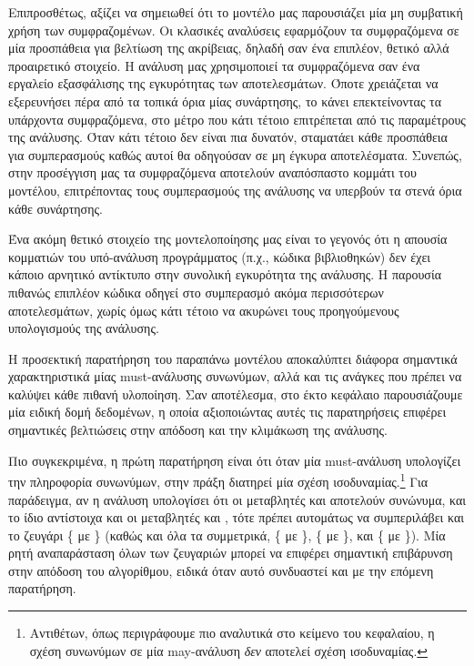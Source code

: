 Επιπροσθέτως, αξίζει να σημειωθεί ότι το μοντέλο μας παρουσιάζει μία μη συμβατική χρήση των συμφραζομένων. Οι κλασικές αναλύσεις εφαρμόζουν τα συμφραζόμενα σε μία προσπάθεια για βελτίωση της ακρίβειας, δηλαδή σαν ένα επιπλέον, θετικό αλλά προαιρετικό στοιχείο. Η ανάλυση μας χρησιμοποιεί τα συμφραζόμενα σαν ένα εργαλείο εξασφάλισης της εγκυρότητας των αποτελεσμάτων. Όποτε χρειάζεται να εξερευνήσει πέρα από τα τοπικά όρια μίας συνάρτησης, το κάνει επεκτείνοντας τα υπάρχοντα συμφραζόμενα, στο μέτρο που κάτι τέτοιο επιτρέπεται από τις παραμέτρους της ανάλυσης. Όταν κάτι τέτοιο δεν είναι πια δυνατόν, σταματάει κάθε προσπάθεια για συμπερασμούς καθώς αυτοί θα οδηγούσαν σε μη έγκυρα αποτελέσματα. Συνεπώς, στην προσέγγιση μας τα συμφραζόμενα αποτελούν αναπόσπαστο κομμάτι του μοντέλου, επιτρέποντας τους συμπερασμούς της ανάλυσης να υπερβούν τα στενά όρια κάθε συνάρτησης.

Ένα ακόμη θετικό στοιχείο της μοντελοποίησης μας είναι το γεγονός ότι η απουσία κομματιών του υπό-ανάλυση προγράμματος (π.χ., κώδικα βιβλιοθηκών) δεν έχει κάποιο αρνητικό αντίκτυπο στην συνολική εγκυρότητα της ανάλυσης. Η παρουσία πιθανώς επιπλέον κώδικα οδηγεί στο συμπερασμό ακόμα περισσότερων αποτελεσμάτων, χωρίς όμως κάτι τέτοιο να ακυρώνει τους προηγούμενους υπολογισμούς της ανάλυσης.


Η προσεκτική παρατήρηση του παραπάνω μοντέλου αποκαλύπτει διάφορα σημαντικά χαρακτηριστικά μίας {\en must-}ανάλυσης συνωνύμων, αλλά και τις ανάγκες που πρέπει να καλύψει κάθε πιθανή υλοποίηση. Σαν αποτέλεσμα, στο έκτο κεφάλαιο παρουσιάζουμε μία ειδική δομή δεδομένων, η οποία αξιοποιώντας αυτές τις παρατηρήσεις επιφέρει σημαντικές βελτιώσεις στην απόδοση και την κλιμάκωση της ανάλυσης.

Πιο συγκεκριμένα, η πρώτη παρατήρηση είναι ότι όταν μία {\en must-}ανάλυση υπολογίζει την πληροφορία συνωνύμων, στην πράξη διατηρεί μία σχέση ισοδυναμίας.\footnote{Αντιθέτων, όπως περιγράφουμε πιο αναλυτικά στο κείμενο του κεφαλαίου, η σχέση συνωνύμων σε μία {\en may-}ανάλυση \emph{δεν} αποτελεί σχέση ισοδυναμίας.} Για παράδειγμα, αν η ανάλυση υπολογίσει ότι οι μεταβλητές {\en {}} και {\en {}} αποτελούν συνώνυμα, και το ίδιο αντίστοιχα και οι μεταβλητές {\en {}} και {\en {}}, τότε πρέπει αυτομάτως να συμπεριλάβει και το ζευγάρι \{{\en {}} με {\en {}}\} (καθώς και όλα τα συμμετρικά, \{{\en {}} με {\en {}}\}, \{{\en {}} με {\en {}}\}, και \{{\en {}} με {\en {}}\}). Μία ρητή αναπαράσταση όλων των ζευγαριών μπορεί να επιφέρει σημαντική επιβάρυνση στην απόδοση του αλγορίθμου, ειδικά όταν αυτό συνδυαστεί και με την επόμενη παρατήρηση.

